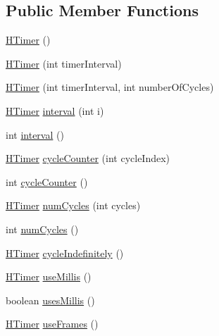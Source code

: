\subsection*{Public Member Functions}
\begin{DoxyCompactItemize}
\item 
\hyperlink{classhype_1_1trigger_1_1_h_timer_aba3878d20ee5c4cdcadf66580e551bd4}{H\-Timer} ()
\item 
\hyperlink{classhype_1_1trigger_1_1_h_timer_a03dd511f89c5a79f2a9740515a5b175a}{H\-Timer} (int timer\-Interval)
\item 
\hyperlink{classhype_1_1trigger_1_1_h_timer_a65a11ba5c1627d57d3063d24025b1c3b}{H\-Timer} (int timer\-Interval, int number\-Of\-Cycles)
\item 
\hyperlink{classhype_1_1trigger_1_1_h_timer}{H\-Timer} \hyperlink{classhype_1_1trigger_1_1_h_timer_a972f8c8b8679668854c50920a23c0598}{interval} (int i)
\item 
int \hyperlink{classhype_1_1trigger_1_1_h_timer_a0df71d324eb5f91fc2d94dfabac1da87}{interval} ()
\item 
\hyperlink{classhype_1_1trigger_1_1_h_timer}{H\-Timer} \hyperlink{classhype_1_1trigger_1_1_h_timer_a48f5134bc4c528654b67426757cf63f1}{cycle\-Counter} (int cycle\-Index)
\item 
int \hyperlink{classhype_1_1trigger_1_1_h_timer_aeffb6653e223d608bf75ffe89699f1a5}{cycle\-Counter} ()
\item 
\hyperlink{classhype_1_1trigger_1_1_h_timer}{H\-Timer} \hyperlink{classhype_1_1trigger_1_1_h_timer_a2de07d87e3226301f7dd0d019b03155c}{num\-Cycles} (int cycles)
\item 
int \hyperlink{classhype_1_1trigger_1_1_h_timer_a03c261afea8e3bff9c2b8dbacf6e8f19}{num\-Cycles} ()
\item 
\hyperlink{classhype_1_1trigger_1_1_h_timer}{H\-Timer} \hyperlink{classhype_1_1trigger_1_1_h_timer_aba4d154cef29ffe50e6e06735c8697bf}{cycle\-Indefinitely} ()
\item 
\hyperlink{classhype_1_1trigger_1_1_h_timer}{H\-Timer} \hyperlink{classhype_1_1trigger_1_1_h_timer_a64e6f685c73eae6455b62f5df34c5e70}{use\-Millis} ()
\item 
boolean \hyperlink{classhype_1_1trigger_1_1_h_timer_a93639f4424715bdf47f3cd2fbc03dc45}{uses\-Millis} ()
\item 
\hyperlink{classhype_1_1trigger_1_1_h_timer}{H\-Timer} \hyperlink{classhype_1_1trigger_1_1_h_timer_afc5dc40c9f10802bc39b4eeb5cebec62}{use\-Frames} ()
\item 

\end{DoxyCompactItemize}
